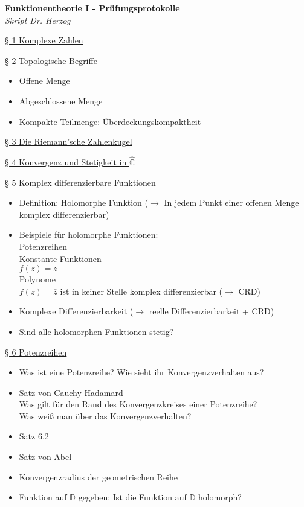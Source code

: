 \documentclass[11pt]{article}
\newcommand{\C}{\mathbb{C}}
\newcommand{\D}{\mathbb{D}}
\begin{document}
\begin{center}
{\Large \textbf{Funktionentheorie I - Prüfungsprotokolle}} \\
\textit{Skript Dr. Herzog}
\end{center}

\underline{§ 1 Komplexe Zahlen}

\underline{§ 2 Topologische Begriffe}
\vspace{-0.5cm}
\begin{itemize}
\item Offene Menge
\item Abgeschlossene Menge
\item Kompakte Teilmenge: Überdeckungskompaktheit
\end{itemize}

\underline{§ 3 Die Riemann'sche Zahlenkugel}

\underline{§ 4 Konvergenz und Stetigkeit in $\hat{\C}$} 

\underline{§ 5 Komplex differenzierbare Funktionen}
\vspace{-0.5cm}
\begin{itemize}
\item Definition: Holomorphe Funktion ($\rightarrow$ In jedem Punkt einer offenen Menge komplex differenzierbar)
\item Beispiele für holomorphe Funktionen: \\
\quad Potenzreihen \\
\quad Konstante Funktionen \\
\quad $f(z) = z$ \\
\quad Polynome \\
\quad $f(z) = \overline{z}$ ist in keiner Stelle komplex differenzierbar ($\rightarrow$ CRD)
\item Komplexe Differenzierbarkeit ($\rightarrow$ reelle Differenzierbarkeit + CRD)
\item Sind alle holomorphen Funktionen stetig?
\end{itemize}

\underline{§ 6 Potenzreihen}
\vspace{-0.5cm}
\begin{itemize}
\item Was ist eine Potenzreihe? Wie sieht ihr Konvergenzverhalten aus?
\item Satz von Cauchy-Hadamard \\
\quad Was gilt für den Rand des Konvergenzkreises einer Potenzreihe? \\
\quad Was weiß man über das Konvergenzverhalten?
\item Satz 6.2
\item Satz von Abel
\item Konvergenzradius der geometrischen Reihe
\item Funktion auf $\D$ gegeben: Ist die Funktion auf $\D$ holomorph?
\end{itemize}
\end{document}
